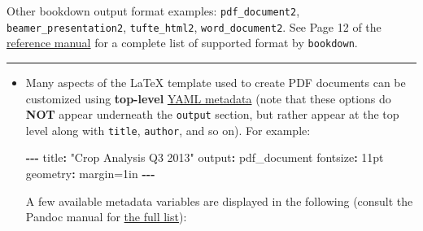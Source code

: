\documentclass[
]{book}
\newenvironment{Shaded}{\begin{snugshade}}{\end{snugshade}}
\newcommand{\DataTypeTok}[1]{\textcolor[rgb]{0.13,0.29,0.53}{#1}}
\newcommand{\DecValTok}[1]{\textcolor[rgb]{0.00,0.00,0.81}{#1}}
\newcommand{\NormalTok}[1]{#1}
\newcommand{\OtherTok}[1]{\textcolor[rgb]{0.56,0.35,0.01}{#1}}
\newcommand{\SpecialCharTok}[1]{\textcolor[rgb]{0.81,0.36,0.00}{\textbf{#1}}}
\newcommand{\StringTok}[1]{\textcolor[rgb]{0.31,0.60,0.02}{#1}}
\theoremstyle{definition}
\theoremstyle{definition}
\theoremstyle{definition}
\theoremstyle{definition}
\theoremstyle{remark}
\begin{document}
Other bookdown output format examples: \texttt{pdf\_document2}, \texttt{beamer\_presentation2}, \texttt{tufte\_html2}, \texttt{word\_document2}. See Page 12 of the \href{https://cran.r-project.org/web/packages/bookdown/bookdown.pdf}{reference manual} for a complete list of supported format by \texttt{bookdown}.

\begin{center}\rule{0.5\linewidth}{0.5pt}\end{center}

\begin{itemize}
\item
  Many aspects of the LaTeX template used to create PDF documents can be customized using {\textbf{top-level}} \href{https://bookdown.org/yihui/rmarkdown/pdf-document.html\#tab:latex-vars}{YAML metadata} (note that these options do {\textbf{NOT}} appear underneath the \texttt{output} section, but rather appear at the top level along with \texttt{title}, \texttt{author}, and so on). For example:

\begin{Shaded}
\begin{Highlighting}[]
\SpecialCharTok{{-}{-}{-}}
\NormalTok{title}\SpecialCharTok{:} \StringTok{"Crop Analysis Q3 2013"}
\NormalTok{output}\SpecialCharTok{:}\NormalTok{ pdf\_document}
\NormalTok{fontsize}\SpecialCharTok{:} \DecValTok{11}\NormalTok{pt}
\NormalTok{geometry}\SpecialCharTok{:}\NormalTok{ margin}\OtherTok{=}\DecValTok{1}\DataTypeTok{i}\NormalTok{n}
\SpecialCharTok{{-}{-}{-}}
\end{Highlighting}
\end{Shaded}

  A few available metadata variables are displayed in the following (consult the Pandoc manual for \href{https://pandoc.org/MANUAL.html\#variables-for-latex}{the full list}):


\end{itemize}
\end{document}
